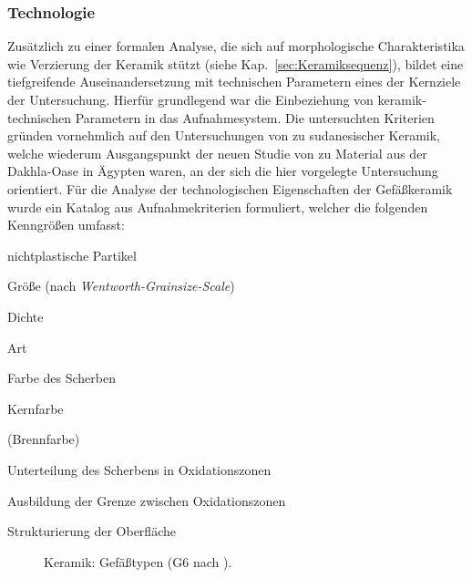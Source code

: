 \begin{multicols}{2}
\subsubsection{Technologie}\label{sec:AufnahmeTechnologie}

Zusätzlich zu einer formalen Analyse, die sich auf morphologische Charakteristika wie Verzierung der Keramik stützt (siehe Kap.~\ref{sec:Keramiksequenz}), bildet eine tiefgreifende Auseinandersetzung mit technischen Parametern eines der Kernziele der Untersuchung. Hierfür grundlegend war die Einbeziehung von keramik-technischen Parametern in das Aufnahmesystem. Die untersuchten Kriterien gründen vornehmlich auf den Untersuchungen von \textcite{Nordstrom.1972} zu sudanesischer Keramik, welche wiederum Ausgangspunkt der neuen Studie von \textcite{Riemer.2011} zu Material aus der Dakhla-Oase in Ägypten waren, an der sich die hier vorgelegte Untersuchung orientiert. Für die Analyse der technologischen Eigenschaften der Gefäßkeramik wurde ein Katalog aus Aufnahmekriterien formuliert, welcher die folgenden Kenngrößen umfasst:
\begin{itemize*}
	\item nichtplastische Partikel
	\begin{itemize*}
		\item Größe (nach \textit{Wentworth-Grainsize-Scale})
		\item Dichte \parencites[32]{Kinne.2009}[nach][]{Hodgson.1976}
		\item Art
	\end{itemize*}
	\item Farbe des Scherben
	\begin{itemize*}
		\item Kernfarbe
		\item (Brennfarbe)
		\item Unterteilung des Scherbens in Oxidationszonen
		\item Ausbildung der Grenze zwischen Oxidationszonen
	\end{itemize*}
	\item Strukturierung der Oberfläche
\end{itemize*}

\begin{figure}[!tb]
	\centering
	\resizebox{\textwidth}{!}{%
		}
	\caption{Keramik: Gefäßtypen (G6 nach \cite[Taf.~XII.175]{Coart.1907}).}
	\label{tab:Keramik_GefFormen}
\end{figure}


\end{multicols}
